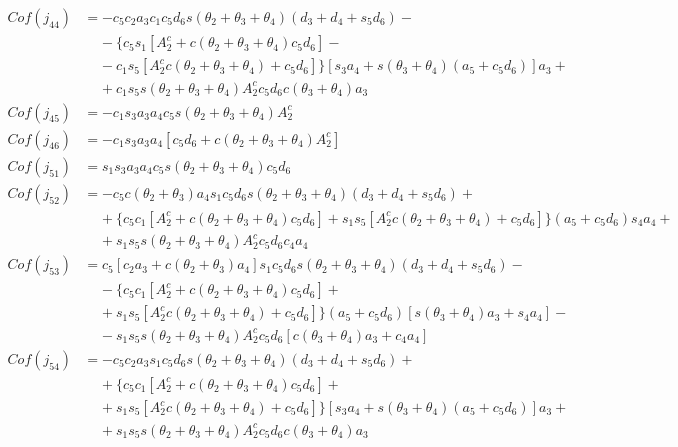 \begin{align*}                
    Cof(j_{44}) &= -c_5c_2a_3c_1c_5d_6s(\theta_2+\theta_3+\theta_4)(d_3+d_4+s_5d_6)- \\
                    & \;\;\;\; -\!\{c_5s_1[A_2^c+c(\theta_2+\theta_3+\theta_4)c_5d_6]-\\
                    & \;\;\;\; -\!c_1s_5[A_2^cc(\theta_2+\theta_3+\theta_4)+c_5d_6]\}[s_3a_4+s(\theta_3+\theta_4)(a_5+c_5d_6)]a_3+\\
                    & \;\;\;\; +\!c_1s_5s(\theta_2+\theta_3+\theta_4)A_2^cc_5d_6c(\theta_3+\theta_4)a_3 \\   
    Cof(j_{45}) &= -c_1s_3a_3a_4c_5s(\theta_2+\theta_3+\theta_4)A_2^c \\
    Cof(j_{46}) &= -c_1s_3a_3a_4[c_5d_6+c(\theta_2+\theta_3+\theta_4)A_2^c] \\                
    Cof(j_{51}) &= s_1s_3a_3a_4c_5s(\theta_2+\theta_3+\theta_4)c_5d_6 \\    
    Cof(j_{52}) &= -c_5c(\theta_2+\theta_3)a_4s_1c_5d_6s(\theta_2+\theta_3+\theta_4)(d_3+d_4+s_5d_6)+ \\
                    & \;\;\;\; +\!\{c_5c_1[A_2^c+c(\theta_2+\theta_3+\theta_4)c_5d_6]+s_1s_5[A_2^cc(\theta_2+\theta_3+\theta_4)+c_5d_6]\}(a_5+c_5d_6)s_4a_4+\\
                    & \;\;\;\; +\!s_1s_5s(\theta_2+\theta_3+\theta_4)A_2^cc_5d_6c_4a_4 \\    
    Cof(j_{53}) &= c_5[c_2a_3+c(\theta_2+\theta_3)a_4]s_1c_5d_6s(\theta_2+\theta_3+\theta_4)(d_3+d_4+s_5d_6)- \\
                    & \;\;\;\; -\!\{c_5c_1[A_2^c+c(\theta_2+\theta_3+\theta_4)c_5d_6]+\\
                    & \;\;\;\; +\!s_1s_5[A_2^cc(\theta_2+\theta_3+\theta_4)+c_5d_6]\}(a_5+c_5d_6)[s(\theta_3+\theta_4)a_3+s_4a_4]-\\
                    & \;\;\;\; -\!s_1s_5s(\theta_2+\theta_3+\theta_4)A_2^cc_5d_6[c(\theta_3+\theta_4)a_3+c_4a_4] \\        
    Cof(j_{54}) &= -c_5c_2a_3s_1c_5d_6s(\theta_2+\theta_3+\theta_4)(d_3+d_4+s_5d_6)+ \\
                    & \;\;\;\; +\!\{c_5c_1[A_2^c+c(\theta_2+\theta_3+\theta_4)c_5d_6]+\\
                    & \;\;\;\; +\!s_1s_5[A_2^cc(\theta_2+\theta_3+\theta_4)+c_5d_6]\}[s_3a_4+s(\theta_3+\theta_4)(a_5+c_5d_6)]a_3+\\
                    & \;\;\;\; +\!s_1s_5s(\theta_2+\theta_3+\theta_4)A_2^cc_5d_6c(\theta_3+\theta_4)a_3 \\   

\end{align*}

